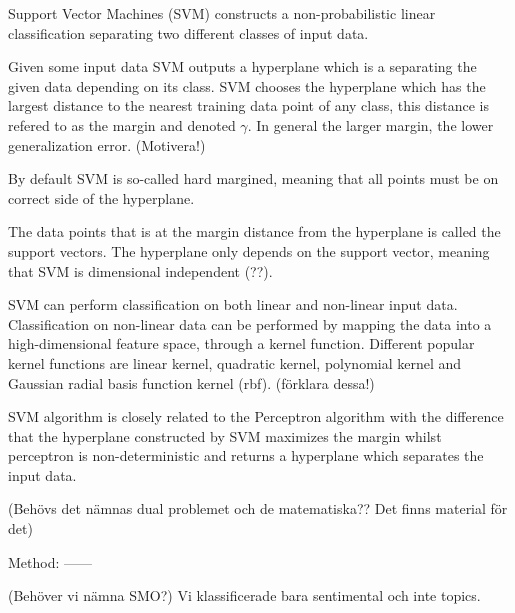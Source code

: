 Support Vector Machines (SVM) constructs a non-probabilistic linear classification separating two different classes of input data. 

Given some input data SVM outputs a hyperplane which is a separating the given data depending on its class. SVM chooses the hyperplane which has the largest distance to the nearest training data point of any class, this distance is refered to as the margin and denoted $\gamma$. In general the larger margin, the lower generalization error. (Motivera!) 

By default SVM is so-called hard margined, meaning that all points must be on correct side of the hyperplane. 

The data points that is at the margin distance from the hyperplane is called the support vectors. The hyperplane only depends on the support vector, meaning that SVM is dimensional independent (??).

SVM can perform classification on both linear and non-linear input data. Classification on non-linear data can be performed by mapping the data into a high-dimensional feature space, through a kernel function. Different popular kernel functions are linear kernel, quadratic kernel, polynomial kernel and Gaussian radial basis function kernel (rbf). (förklara dessa!)

SVM algorithm is closely related to the Perceptron algorithm with the difference that the hyperplane constructed by SVM maximizes the margin whilst perceptron is non-deterministic and returns a hyperplane which separates the input data. 

(Behövs det nämnas dual problemet och de matematiska?? Det finns material för det)

Method:
------

(Behöver vi nämna SMO?)
Vi klassificerade bara sentimental och inte topics. 
